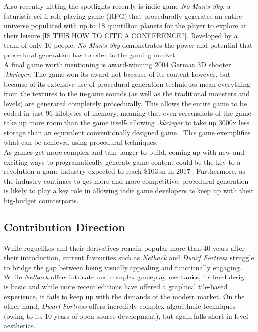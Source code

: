 \documentclass[12pt,a4paper]{article}
\begin{document}
Also recently hitting the spotlights recently is indie game \emph{No Man's Sky}, a futuristic sci-fi role-playing game (RPG) that procedurally generates an entire universe populated with up to 18 quintillion planets for the player to explore at their leisure \cite{E3} [IS THIS HOW TO CITE A CONFERENCE?]. Developed by a team of only 10 people, \emph{No Man's Sky} demonstrates the power and potential that procedural generation has to offer to the gaming market. \\


A final game worth mentioning is award-winning 2004 German 3D shooter \emph{.kkrieger}. The game won its award not because of its content however, but because of its extensive use of procedural generation techniques mean everything from the textures to the in-game sounds (as well as the traditional monsters and levels) are generated completely procedurally. This allows the entire game to be coded in just 96 kilobytes of memory, meaning that even screenshots of the game take up more room than the game itself- allowing \emph{.kkrieger} to take up 3000x less storage than an equivalent conventionally designed game \cite{kkrieger}. This game exemplifies what can be achieved using procedural techniques. \\

As games get more complex and take longer to build, coming up with new and exciting ways to programatically generate game content could be the key to a revolution a game industry expected to reach \$103bn in 2017 \cite{newzoo}. Furthermore, as the industry continues to get more and more competitive, procedural generation is likely to play a key role in allowing indie game developers to keep up with their big-budget counterparts.

\subsection{Contribution Direction}

While roguelikes and their derivatives remain popular more than 40 years after their introduction, current favourites such as \emph{Nethack} and \emph{Dwarf Fortress} struggle to bridge the gap between being visually appealing and functionally engaging. While \emph{Nethack} offers intricate and complex gameplay mechanics, its level design is basic and while more recent editions have offered a graphical tile-based experience, it fails to keep up with the demands of the modern market. On the other hand, \emph{Dwarf Fortress} offers incredibly complex algorithmic techniques (owing to its 10 years of open source development), but again falls short in level aesthetics. \\
\end{document}
